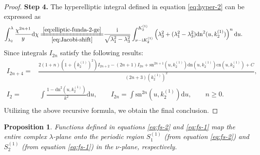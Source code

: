 \documentclass[11pt,reqno]{amsart}
\newcommand{\ii}{\mathrm{i}}
\newcommand{\sn}{\mathrm{sn}}
\newcommand{\cn}{\mathrm{cn}}
\newcommand{\dn}{\mathrm{dn}}
\newcommand{\dd}{\mathrm{d}}
\newtheorem{prop}{Proposition}
\numberwithin{equation}{section}
\begin{document}
\begin{proof}
	
	\textbf{Step 4.}
	The hyperelliptic integral defined in equation \eqref{eq:hyper-2} can be expressed as
	\begin{equation}\label{eq:integral-dn-2}
		\begin{split}
			\int_{\lambda_2}^{\lambda}\frac{\chi^{2n+1}}{y}\dd \chi
			\xlongequal[\eqref{eq:Jacobi-shift}]{\eqref{eq:elliptic-funda-2-ge}}&\frac{\ii}{\sqrt{\lambda_1^2-\lambda_3^2}}\int_{\nu-\ii K^{(1)}_2}^{   K^{(1)}_2}\left(\lambda_3^2+(\lambda_1^2-\lambda_3^2)\dn^2(u,  k^{(1)}_2)\right)^n \dd u.
		\end{split}
	\end{equation}
	Since integrals $I_{2n}$ satisfy the following results:
	\begin{equation}\label{eq:recursive-formula-dn}
		\begin{split}
			\!\! \! I_{2n+4}=&  \frac{2(1+n)(1+(k^{(1)}_2)^2)I_{2n+2}-(2n+1)I_{2n}+\sn^{2n+1}(u,k^{(1)}_2)\dn(u,k^{(1)}_2)\cn(u,k^{(1)}_2)+C}{(2n+3)(k^{(1)}_2)^2},\\	I_{2}=&\ \int \frac{1-\dn^{2}(u,k^{(1)}_2)}{k^2}\dd u
			,\qquad I_{2n}= \int \sn^{2n}(u,k^{(1)}_2)\dd u, \qquad n\ge 0.
			\\ 
		\end{split}
	\end{equation}
	Utilizing the above recursive formula, we obtain the final conclusion.	
\end{proof}

\begin{prop}\label{prop:appendenx-f-1-2}
	Functions defined in equations \eqref{eq:fs-2} and \eqref{eq:fs-1} map the entire complex $\lambda$-plane onto the periodic region $S^{(1)} _1$ (from equation \eqref{eq:fs-2}) and $S^{(1)}_2$ (from equation \eqref{eq:fs-1}) in the $\nu$-plane, respectively.
\end{prop}
\end{document}
